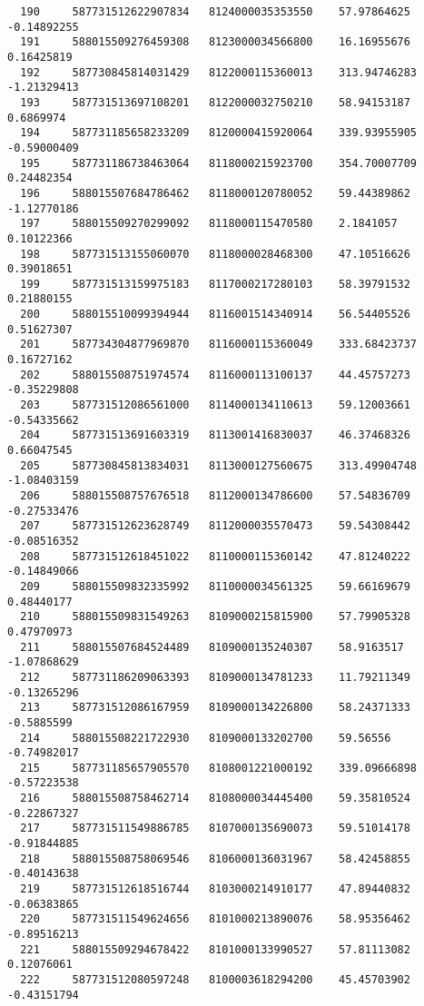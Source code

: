 \documentclass[a4paper,11pt]{article}
\begin{document}
\begin{verbatim}
  190     587731512622907834   8124000035353550    57.97864625    -0.14892255  
  191     588015509276459308   8123000034566800    16.16955676    0.16425819   
  192     587730845814031429   8122000115360013    313.94746283   -1.21329413  
  193     587731513697108201   8122000032750210    58.94153187    0.6869974    
  194     587731185658233209   8120000415920064    339.93955905   -0.59000409  
  195     587731186738463064   8118000215923700    354.70007709   0.24482354   
  196     588015507684786462   8118000120780052    59.44389862    -1.12770186  
  197     588015509270299092   8118000115470580    2.1841057      0.10122366   
  198     587731513155060070   8118000028468300    47.10516626    0.39018651   
  199     587731513159975183   8117000217280103    58.39791532    0.21880155   
  200     588015510099394944   8116001514340914    56.54405526    0.51627307   
  201     587734304877969870   8116000115360049    333.68423737   0.16727162   
  202     588015508751974574   8116000113100137    44.45757273    -0.35229808  
  203     587731512086561000   8114000134110613    59.12003661    -0.54335662  
  204     587731513691603319   8113001416830037    46.37468326    0.66047545   
  205     587730845813834031   8113000127560675    313.49904748   -1.08403159  
  206     588015508757676518   8112000134786600    57.54836709    -0.27533476  
  207     587731512623628749   8112000035570473    59.54308442    -0.08516352  
  208     587731512618451022   8110000115360142    47.81240222    -0.14849066  
  209     588015509832335992   8110000034561325    59.66169679    0.48440177   
  210     588015509831549263   8109000215815900    57.79905328    0.47970973   
  211     588015507684524489   8109000135240307    58.9163517     -1.07868629  
  212     587731186209063393   8109000134781233    11.79211349    -0.13265296  
  213     587731512086167959   8109000134226800    58.24371333    -0.5885599   
  214     588015508221722930   8109000133202700    59.56556       -0.74982017  
  215     587731185657905570   8108001221000192    339.09666898   -0.57223538  
  216     588015508758462714   8108000034445400    59.35810524    -0.22867327  
  217     587731511549886785   8107000135690073    59.51014178    -0.91844885  
  218     588015508758069546   8106000136031967    58.42458855    -0.40143638  
  219     587731512618516744   8103000214910177    47.89440832    -0.06383865  
  220     587731511549624656   8101000213890076    58.95356462    -0.89516213  
  221     588015509294678422   8101000133990527    57.81113082    0.12076061   
  222     587731512080597248   8100003618294200    45.45703902    -0.43151794  

\end{verbatim}
\end{document}
